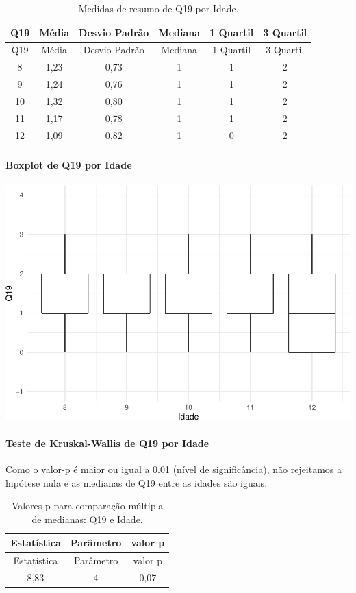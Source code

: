 \documentclass[]{article}
\let\oldparagraph\paragraph
\renewcommand{\paragraph}[1]{\oldparagraph{#1}\mbox{}}
\begin{document}
\begin{longtable}[]{@{}cccccc@{}}
\caption{\label{tab:unnamed-chunk-332}Medidas de resumo de Q19 por Idade.}\tabularnewline
\toprule
Q19 & Média & Desvio Padrão & Mediana & 1 Quartil & 3 Quartil\tabularnewline
\midrule
\endfirsthead
\toprule
Q19 & Média & Desvio Padrão & Mediana & 1 Quartil & 3 Quartil\tabularnewline
\midrule
\endhead
8 & 1,23 & 0,73 & 1 & 1 & 2\tabularnewline
9 & 1,24 & 0,76 & 1 & 1 & 2\tabularnewline
10 & 1,32 & 0,80 & 1 & 1 & 2\tabularnewline
11 & 1,17 & 0,78 & 1 & 1 & 2\tabularnewline
12 & 1,09 & 0,82 & 1 & 0 & 2\tabularnewline
\bottomrule
\end{longtable}

\hypertarget{boxplot-de-q19-por-idade}{%
\paragraph{Boxplot de Q19 por Idade}\label{boxplot-de-q19-por-idade}}

\begin{center}\includegraphics[width=0.75\linewidth]{relatorio_covid19_files/figure-latex/unnamed-chunk-333-1} \end{center}

\hypertarget{teste-de-kruskal-wallis-de-q19-por-idade}{%
\paragraph{Teste de Kruskal-Wallis de Q19 por Idade}\label{teste-de-kruskal-wallis-de-q19-por-idade}}

Como o valor-p é maior ou igual a 0.01 (nível de significância), não rejeitamos a hipótese nula e as medianas de Q19 entre as idades são iguais.

\begin{longtable}[]{@{}ccc@{}}
\caption{\label{tab:unnamed-chunk-335}Valores-p para comparação múltipla de medianas: Q19 e Idade.}\tabularnewline
\toprule
Estatística & Parâmetro & valor p\tabularnewline
\midrule
\endfirsthead
\toprule
Estatística & Parâmetro & valor p\tabularnewline
\midrule
\endhead
8,83 & 4 & 0,07\tabularnewline
\bottomrule
\end{longtable}
\end{document}

